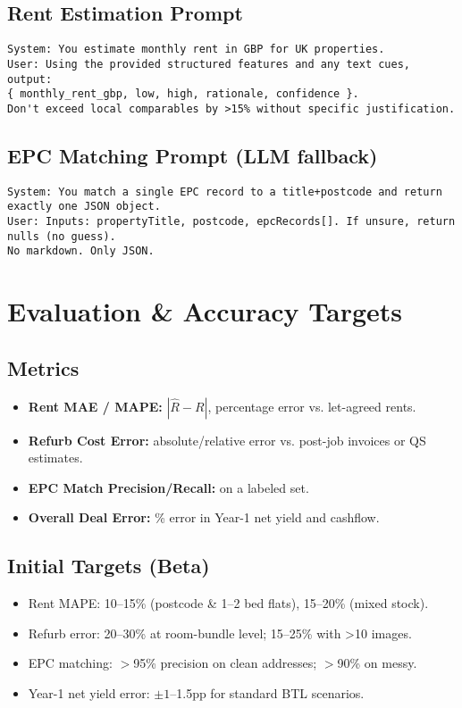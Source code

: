 \documentclass[12pt,a4paper]{article}
\begin{document}
\subsection{Rent Estimation Prompt}
\begin{lstlisting}
System: You estimate monthly rent in GBP for UK properties.
User: Using the provided structured features and any text cues, output:
{ monthly_rent_gbp, low, high, rationale, confidence }.
Don't exceed local comparables by >15% without specific justification.
\end{lstlisting}

\subsection{EPC Matching Prompt (LLM fallback)}
\begin{lstlisting}
System: You match a single EPC record to a title+postcode and return exactly one JSON object.
User: Inputs: propertyTitle, postcode, epcRecords[]. If unsure, return nulls (no guess).
No markdown. Only JSON.
\end{lstlisting}

\section{Evaluation \& Accuracy Targets}
\subsection{Metrics}
\begin{itemize}[leftmargin=1.5em]
  \item \textbf{Rent MAE / MAPE:} $| \hat{R} - R |$, percentage error vs. let-agreed rents.
  \item \textbf{Refurb Cost Error:} absolute/relative error vs. post-job invoices or QS estimates.
  \item \textbf{EPC Match Precision/Recall:} on a labeled set.
  \item \textbf{Overall Deal Error:} \% error in Year-1 net yield and cashflow.
\end{itemize}

\subsection{Initial Targets (Beta)}
\begin{itemize}[leftmargin=1.5em]
  \item Rent MAPE: 10–15\% (postcode \& 1–2 bed flats), 15–20\% (mixed stock).
  \item Refurb error: 20–30\% at room-bundle level; 15–25\% with >10 images.
  \item EPC matching: $>$95\% precision on clean addresses; $>$90\% on messy.
  \item Year-1 net yield error: $\pm 1$–1.5pp for standard BTL scenarios.
\end{itemize}
\end{document}
